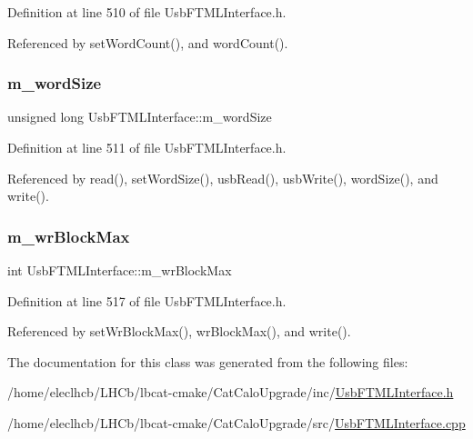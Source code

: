 Definition at line 510 of file Usb\+F\+T\+M\+L\+Interface.\+h.



Referenced by set\+Word\+Count(), and word\+Count().

\mbox{\label{classUsbFTMLInterface_a39a8dfbe54cc29e033fa2a4d5fbbc982}} 
\subsubsection{\texorpdfstring{m\+\_\+word\+Size}{m\_wordSize}}
{\footnotesize\ttfamily unsigned long Usb\+F\+T\+M\+L\+Interface\+::m\+\_\+word\+Size\hspace{0.3cm}{\ttfamily [private]}}



Definition at line 511 of file Usb\+F\+T\+M\+L\+Interface.\+h.



Referenced by read(), set\+Word\+Size(), usb\+Read(), usb\+Write(), word\+Size(), and write().

\mbox{\label{classUsbFTMLInterface_adb3d6b099e8283d80360f78fab064285}} 
\subsubsection{\texorpdfstring{m\+\_\+wr\+Block\+Max}{m\_wrBlockMax}}
{\footnotesize\ttfamily int Usb\+F\+T\+M\+L\+Interface\+::m\+\_\+wr\+Block\+Max\hspace{0.3cm}{\ttfamily [private]}}



Definition at line 517 of file Usb\+F\+T\+M\+L\+Interface.\+h.



Referenced by set\+Wr\+Block\+Max(), wr\+Block\+Max(), and write().



The documentation for this class was generated from the following files\+:\begin{DoxyCompactItemize}
\item 
/home/eleclhcb/\+L\+H\+Cb/lbcat-\/cmake/\+Cat\+Calo\+Upgrade/inc/\hyperlink{UsbFTMLInterface_8h}{Usb\+F\+T\+M\+L\+Interface.\+h}\item 
/home/eleclhcb/\+L\+H\+Cb/lbcat-\/cmake/\+Cat\+Calo\+Upgrade/src/\hyperlink{UsbFTMLInterface_8cpp}{Usb\+F\+T\+M\+L\+Interface.\+cpp}\end{DoxyCompactItemize}
